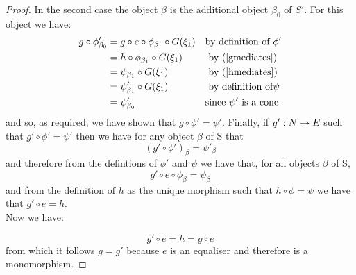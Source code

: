 \documentclass[10pt,a4paper]{scrartcl}
\begin{document}
\begin{proof}
\noindent
In the second case the object $\beta$ is the additional object $\beta_0$ of $S'$. For this object we have:
\begin{align*}
g \circ \phi'_{\beta_0}
   & = g \circ e \circ \phi_{\beta_1} \circ G(\xi_1)  && \mbox{by definition of }\phi' \\ 
             & = h \circ \phi_{\beta_1} \circ G(\xi_1) && \mbox{ by (\ref{gmediates})} \\
             & = \psi_{\beta_1}  \circ G(\xi_1)       && \mbox{ by (\ref{hmediates})} \\
						 & = \psi'_{\beta_1} \circ G(\xi_1)       && \mbox{ by definition of} \psi \\
						& = \psi'_{\beta_0}                        && \mbox{since }\psi' \mbox{ is a cone} \\ 
\end{align*}
and so, as required, we have shown that 
$g \circ \phi' = \psi'$.
\noindent Finally, if $g':N \rightarrow E$ such that $g' \circ \phi' = \psi'$ then we have 
for any object $\beta$ of S that
$$(g'\circ\phi')_\beta = \psi'_\beta$$
\noindent
and therefore from the defintions of $\phi'$ and $\psi$ we have
that, for all objects $\beta$ of S,
$$
g' \circ e \circ \phi_\beta = \psi_\beta
$$
\noindent
and  from the definition of $h$ as the unique morphism such that
$h \circ \phi = \psi$ we have that 
$g' \circ e = h$.\\

\noindent
Now we have:
 
$$g' \circ e = h = g \circ e$$
from which it follows $g=g'$ because $e$ is an equaliser and therefore is a monomorphism. 
\end{proof}


\end{document}
